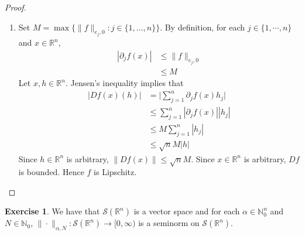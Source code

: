 \documentclass{book}
\theoremstyle{definition}
\newtheorem{ex}[definition]{Exercise}
\newcommand{\al}{\alpha}
\newcommand{\N}{\mathbb{N}}
\newcommand{\R}{\mathbb{R}}
\newcommand{\MS}{\mathcal{S}}
\DeclareMathOperator*{\0}{\mbf{0}}
\DeclareMathOperator*{\1}{\mbf{1}}
\newcommand{\p}{\partial}
\newcommand{\Rg}{[0,\infty)}
\begin{document}
	\begin{proof}\
		\begin{enumerate}
			\item Set $M = \max \{\|f\|_{e_j, 0} : j \in \{1, \ldots, n\}\}$. By definition, for each $j \in \{1, \cdots, n\}$ and $x \in \R^n$, 
			\begin{align*}
				| \p_j f(x)| 
				& \leq \|f\|_{e_j, 0} \\
				& \leq M  
			\end{align*}
			Let $x, h \in \R^n$. Jensen's inequality implies that
			\begin{align*}
				|Df(x)(h)|
				& = \bigg| \sum_{j = 1}^n \p_jf(x) h_j \bigg| \\
				& \leq \sum_{j = 1}^n |\p_jf(x)| |h_j| \\
				& \leq M \sum_{j = 1}^n |h_j| \\
				& \leq \sqrt{n} M |h| 
			\end{align*}
			Since $h \in \R^n$ is arbitrary, $\|Df(x)\| \leq \sqrt{n}M$. Since $x \in \R^n$ is arbitrary, $Df$ is bounded. Hence $f$ is Lipschitz.
			
		\end{enumerate}
	\end{proof}

	\begin{ex} We have that $\MS(\R^n)$ is a vector space and for each $\al \in \N_0^n$ and $N \in  \N_0$,  $\| \cdot \|_{\al, N}: \MS(\R^n) \rightarrow \Rg$ is a seminorm on $\MS(\R^n)$.
	\end{ex}
\end{document}
